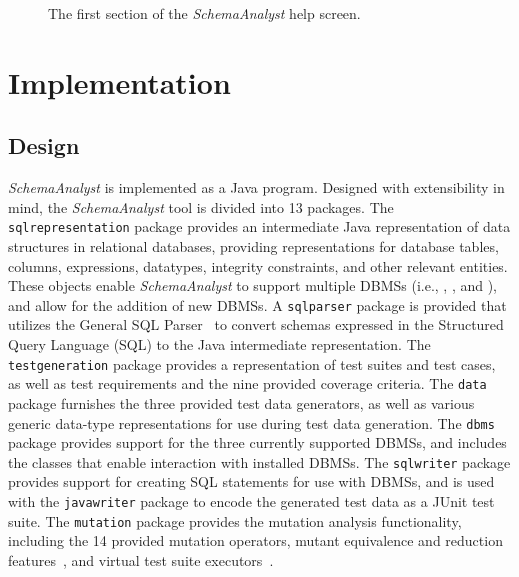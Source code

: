 \begin{figure}

\caption{\label{fig:usage} The first section of the \textit{SchemaAnalyst} help screen.}
\end{figure}

\section{Implementation}\label{sec:implementation}
\subsection{Design}


\textit{SchemaAnalyst} is implemented as a Java program.  Designed with extensibility in mind, the
\textit{SchemaAnalyst} tool is divided into 13 packages. The \texttt{sqlrepresentation} package provides an intermediate
Java representation of data structures in relational databases, providing representations for database tables, columns,
expressions, datatypes, integrity constraints, and other relevant entities. These objects enable \textit{SchemaAnalyst}
to support multiple DBMSs (i.e., \sqlite, \postgres, and \hypersql), and allow for the addition of new DBMSs. A
\texttt{sqlparser} package is provided that utilizes the General SQL Parser~\cite{} to convert schemas expressed in the
Structured Query Language (SQL) to the Java intermediate representation. The \texttt{testgeneration} package provides a
representation of test suites and test cases, as well as test requirements and the nine provided coverage criteria. The
\texttt{data} package furnishes the three provided test data generators, as well as various generic data-type
representations for use during test data generation. The \texttt{dbms} package provides support for the three currently
supported DBMSs, and includes the classes that enable interaction with installed DBMSs. The \texttt{sqlwriter} package
provides support for creating SQL statements for use with DBMSs, and is used with the \texttt{javawriter} package to
encode the generated test data as a JUnit test suite. The \texttt{mutation} package provides the mutation analysis
functionality, including the 14 provided mutation operators, mutant equivalence and reduction
features~\cite{wright2014impact}, and virtual test suite executors~\cite{mcminn2016virtual}.

